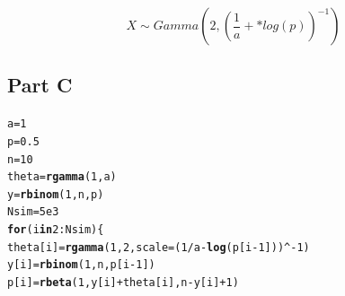 \documentclass{article}\usepackage[]{graphicx}\usepackage[]{color}
\makeatletter
\newcommand{\hlnum}[1]{\textcolor[rgb]{0.686,0.059,0.569}{#1}}%
\newcommand{\hlopt}[1]{\textcolor[rgb]{0,0,0}{#1}}%
\newcommand{\hlstd}[1]{\textcolor[rgb]{0.345,0.345,0.345}{#1}}%
\newcommand{\hlkwa}[1]{\textcolor[rgb]{0.161,0.373,0.58}{\textbf{#1}}}%
\newcommand{\hlkwb}[1]{\textcolor[rgb]{0.69,0.353,0.396}{#1}}%
\newcommand{\hlkwc}[1]{\textcolor[rgb]{0.333,0.667,0.333}{#1}}%
\newcommand{\hlkwd}[1]{\textcolor[rgb]{0.737,0.353,0.396}{\textbf{#1}}}%
\newenvironment{kframe}{%
 \def\at@end@of@kframe{}%
 \ifinner\ifhmode%
  \def\at@end@of@kframe{\end{minipage}}%
  \begin{minipage}{\columnwidth}%
 \fi\fi%
 \def\FrameCommand##1{\hskip\@totalleftmargin \hskip-\fboxsep
 \colorbox{shadecolor}{##1}\hskip-\fboxsep
     \hskip-\linewidth \hskip-\@totalleftmargin \hskip\columnwidth}%
 \MakeFramed {\advance\hsize-\width
   \@totalleftmargin\z@ \linewidth\hsize
   \@setminipage}}%
 {\par\unskip\endMakeFramed%
 \at@end@of@kframe}
\newenvironment{knitrout}{}{} %
\makeatother
\begin{document}
\begin{equation}
X \sim Gamma(2, (\frac{1}{a}+*log(p))^{-1})
\end{equation}

\subsection*{Part C}
\begin{knitrout}
\color{fgcolor}\begin{kframe}
\begin{alltt}
\hlstd{a} \hlkwb{=} \hlnum{1}
\hlstd{p} \hlkwb{=} \hlnum{0.5}
\hlstd{n} \hlkwb{=} \hlnum{10}
\hlstd{theta} \hlkwb{=} \hlkwd{rgamma}\hlstd{(}\hlnum{1}\hlstd{, a)}
\hlstd{y} \hlkwb{=} \hlkwd{rbinom}\hlstd{(}\hlnum{1}\hlstd{,n,p)}
\hlstd{Nsim} \hlkwb{=} \hlnum{5e3}
 \hlkwa{for} \hlstd{(i} \hlkwa{in} \hlnum{2}\hlopt{:}\hlstd{Nsim)\{}
  \hlstd{theta[i]} \hlkwb{=} \hlkwd{rgamma}\hlstd{(}\hlnum{1}\hlstd{,} \hlnum{2}\hlstd{,} \hlkwc{scale} \hlstd{= (}\hlnum{1}\hlopt{/}\hlstd{a}\hlopt{-}\hlkwd{log}\hlstd{(p[i}\hlopt{-}\hlnum{1}\hlstd{]))}\hlopt{^-}\hlnum{1}\hlstd{)}
  \hlstd{y[i]} \hlkwb{=} \hlkwd{rbinom}\hlstd{(}\hlnum{1}\hlstd{, n, p[i}\hlopt{-}\hlnum{1}\hlstd{])}
  \hlstd{p[i]} \hlkwb{=} \hlkwd{rbeta}\hlstd{(}\hlnum{1}\hlstd{, y[i]}\hlopt{+}\hlstd{theta[i],n}\hlopt{-}\hlstd{y[i]}\hlopt{+}\hlnum{1}\hlstd{)}


\end{alltt}
\end{kframe}
\end{knitrout}
\end{document}
